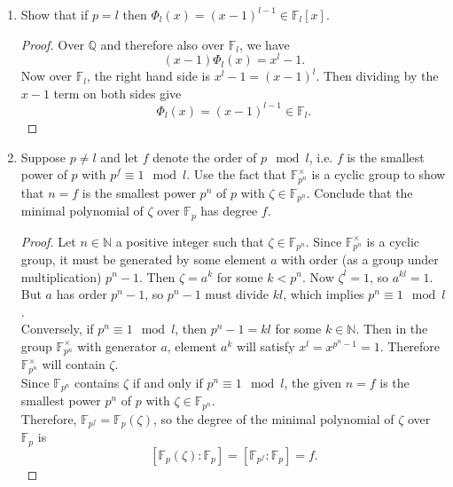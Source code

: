 \documentclass{article}
\begin{document}
  \begin{enumerate}[label={(\alph*)}]
    \item Show that if $p=l$ then $\Phi_l(x)=(x-1)^{l-1}
      \in\mathbb{F}_l[x]$.

      \begin{proof}
        Over $\mathbb{Q}$ and therefore also over $\mathbb{F}_l$, we have
        \[(x-1)\Phi_l(x) =x^l-1.\]
        Now over $\mathbb{F}_l$, the right hand side is $x^l-1=(x-1)^l$.
        Then dividing by the $x-1$ term on both sides give
        \[\Phi_l(x)=(x-1)^{l-1} \in\mathbb{F}_l.\]
      \end{proof}

    \item Suppose $p\neq l$ and let $f$ denote the order of $p\mod l$, i.e.
      $f$ is the smallest power of $p$ with $p^f\equiv1\mod l$. Use the
      fact that $\mathbb{F}_{p^n}^\times$ is a cyclic group to show that
      $n=f$ is the smallest power $p^n$ of $p$ with
      $\zeta\in\mathbb{F}_{p^n}$. Conclude that the minimal polynomial of
      $\zeta$ over $\mathbb{F}_p$ has degree $f$.

      \begin{proof}
        Let $n\in\mathbb{N}$ a positive integer such that
        $\zeta\in\mathbb{F}_{p^n}$. Since $\mathbb{F}_{p^n}^\times$ is a
        cyclic group, it must be generated by some element $a$ with order
        (as a group under multiplication) $p^n-1$. Then $\zeta=a^k$ for some
        $k<p^n$. Now $\zeta^l=1$, so $a^{kl}=1$. But $a$ has order $p^n-1$,
        so $p^n-1$ must divide $kl$, which implies $p^n\equiv1\mod l$. \\

        Conversely, if $p^n\equiv1\mod l$, then $p^n-1=kl$ for some
        $k\in\mathbb{N}$. Then in the group $\mathbb{F}_{p^n}^\times$ with
        generator $a$, element $a^k$ will satisfy $x^l=x^{p^n-1}=1$.
        Therefore $\mathbb{F}_{p^n}^\times$ will contain $\zeta$. \\

        Since $\mathbb{F}_{p^n}$ contains $\zeta$ if and only if
        $p^n\equiv1\mod l$, the given $n=f$ is the smallest power $p^n$ of
        $p$ with $\zeta\in\mathbb{F}_{p^n}$. \\

        Therefore, $\mathbb{F}_{p^f}=\mathbb{F}_p(\zeta)$, so the degree of
        the minimal polynomial of $\zeta$ over $\mathbb{F}_p$ is
        \[[\mathbb{F}_p(\zeta):\mathbb{F}_p] =[\mathbb{F}_{p^f}:\mathbb{F}_p]
        =f.\]
      \end{proof}


\end{enumerate}
\end{document}
